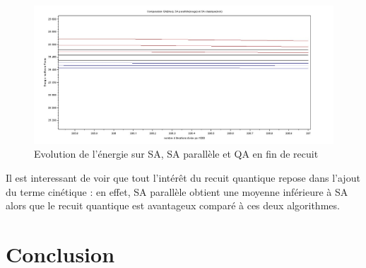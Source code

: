 \documentclass{article}%
\begin{document}
	\begin{figure}[!ht]
		
	\begin{center}
	\includegraphics[scale=0.25]{brazil58_zoom.jpg}
	\caption{Evolution de l'énergie sur SA, SA parallèle et QA en fin de recuit}
	\label{comparaison}
	\end{center}
	\end{figure}
	
		Il est interessant de voir que tout l'intérêt du recuit quantique repose dans l'ajout du terme cinétique : en effet, SA parallèle obtient une moyenne inférieure à SA alors que le recuit quantique est avantageux comparé à ces deux algorithmes.
		

\clearpage	
\section*{Conclusion}

\clearpage	
\listoffigures
\listofalgorithms

\end{document}

